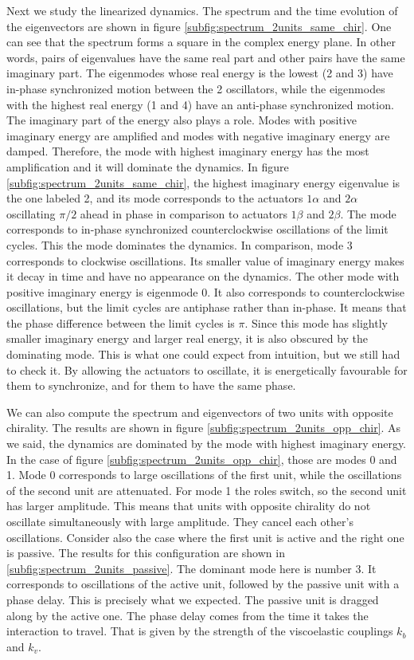 \documentclass[11pt, a4paper]{article} %
\begin{document}
Next we study the linearized dynamics. 
The spectrum and the time evolution of the eigenvectors are shown in figure \ref{subfig:spectrum_2units_same_chir}.
One can see that the spectrum forms a square in the complex energy plane. In other words, pairs of eigenvalues have the same real 
part and other pairs have the same imaginary part. The eigenmodes whose real energy is the lowest (2 and 3) have in-phase synchronized motion 
between the 2 oscillators, while the eigenmodes with the highest real energy (1 and 4) have an anti-phase synchronized motion.
The imaginary part of the energy also plays a role. Modes with positive imaginary energy are amplified and modes with negative 
imaginary energy are damped. Therefore, the mode with highest imaginary energy has the most amplification and it will dominate the 
dynamics. In figure \ref{subfig:spectrum_2units_same_chir}, the highest imaginary energy eigenvalue is the one labeled 2, 
and its mode corresponds to 
the actuators $1\alpha$ and $2\alpha$ oscillating $\pi/2$ ahead in phase in comparison to actuators $1\beta$ and $2\beta$. 
The mode corresponds to in-phase synchronized counterclockwise oscillations of the limit cycles. This the mode dominates the dynamics.
In comparison, mode 3 corresponds to clockwise oscillations. Its smaller value 
of imaginary energy makes it decay in time and have no appearance on the dynamics. The other mode with positive imaginary energy is 
eigenmode 0. It also corresponds to counterclockwise oscillations, but the limit cycles are antiphase rather than in-phase. It means 
that the phase difference between the limit cycles is $\pi$. Since this mode has slightly smaller imaginary energy and larger real energy, 
it is also obscured by the dominating mode.
This is what one could expect from intuition, but we still had to check it. By allowing the actuators to oscillate, 
it is energetically favourable for them to synchronize, and for them to have the same phase.

We can also compute the spectrum and eigenvectors of two units with opposite chirality. 
The results are shown in figure \ref{subfig:spectrum_2units_opp_chir}. As we said, the dynamics are dominated by the mode 
with highest imaginary energy. In the case of figure \ref{subfig:spectrum_2units_opp_chir}, those are modes 0 and 1. 
Mode 0 corresponds to large oscillations of the first unit, while the oscillations of the second unit are attenuated. 
For mode 1 the roles switch, so the second unit has larger amplitude. This means that units with opposite chirality 
do not oscillate simultaneously with large amplitude. They cancel each other's oscillations.
Consider also the case where the first unit is active and the right one is passive. 
The results for this configuration are shown in \ref{subfig:spectrum_2units_passive}. The dominant mode here is number 3. 
It corresponds to oscillations of the active unit, followed by the passive unit with a phase delay. This is 
precisely what we expected. The passive unit is dragged along by the active one. 
The phase delay comes from the time it takes the interaction to travel. That is given by the strength of 
the viscoelastic couplings $k_b$ and $k_v$. 
\end{document}
